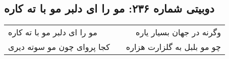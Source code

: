 \begin{center}
\section*{دوبیتی شماره ۲۳۶: مو را ای دلبر مو با ته کاره}
\label{sec:236}
\begin{longtable}{l p{0.5cm} r}
مو را ای دلبر مو با ته کاره
&&
وگرنه در جهان بسیار یاره
\\
کجا پروای چون مو سوته دیری
&&
چو مو بلبل به گلزارت هزاره
\\
\end{longtable}
\end{center}
